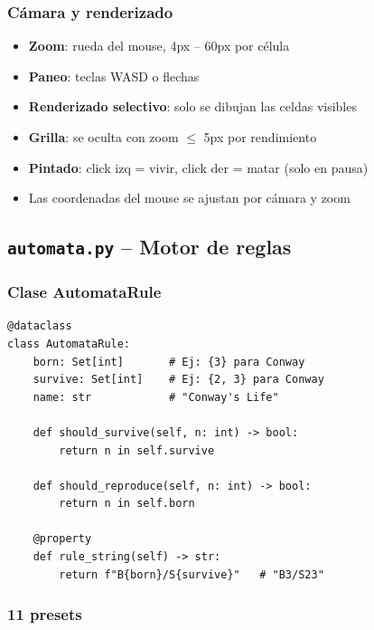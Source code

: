 \documentclass[12pt,a4paper]{article}
\begin{document}
\subsubsection{Cámara y renderizado}

\begin{itemize}
  \item \textbf{Zoom}: rueda del mouse, 4px -- 60px por célula
  \item \textbf{Paneo}: teclas WASD o flechas
  \item \textbf{Renderizado selectivo}: solo se dibujan las celdas visibles
  \item \textbf{Grilla}: se oculta con zoom $\leq$ 5px por rendimiento
  \item \textbf{Pintado}: click izq = vivir, click der = matar (solo en pausa)
  \item Las coordenadas del mouse se ajustan por cámara y zoom
\end{itemize}

\subsection{\texttt{automata.py} -- Motor de reglas}

\subsubsection{Clase AutomataRule}

\begin{lstlisting}
@dataclass
class AutomataRule:
    born: Set[int]       # Ej: {3} para Conway
    survive: Set[int]    # Ej: {2, 3} para Conway
    name: str            # "Conway's Life"

    def should_survive(self, n: int) -> bool:
        return n in self.survive

    def should_reproduce(self, n: int) -> bool:
        return n in self.born

    @property
    def rule_string(self) -> str:
        return f"B{born}/S{survive}"   # "B3/S23"
\end{lstlisting}

\subsubsection{11 presets}
\end{document}

